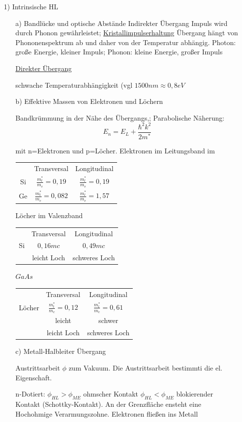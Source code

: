 \begin{enumerate}
\item[1)] Intrinsische HL

  \begin{enumerate}
  \item[a)] Bandlücke und optische Abstände Indirekter Übergang
 Impuls wird durch Phonon gewährleistet; 
    \underline{ Kristallimpulserhaltung}
Übergang hängt von  Phononenspektrum ab und daher von der Temperatur abhängig. Photon: große Energie, kleiner Impuls; Phonon: kleine Energie, großer Impuls

\underline{Direkter Übergang}

schwache Temperaturabhängigkeit (vgl \(1500nm\approx 0,8eV\)
  \item[b)] Effektive Massen von Elektronen und Löchern

 Bandkrümmung in der Nähe des Übergangs,; Parabolische Näherung:
\[E_n= E_L + \frac{\hbar^2 k^2}{2m^*}\]

mit n=Elektronen und p=Löcher. Elektronen im Leitungsband im 

\begin{tabular}{ccc}
&Transversal&Longitudinal\\
  Si & \(\frac{m^*_t}{m_e}=0,19\)& \(\frac{m^*_l}{m_e}=0,19\)\\
Ge&  \(\frac{m^*_t}{m_e}=0,082\)& \(\frac{m^*_l}{m_e}=1,57\)
\end{tabular}

Löcher im Valenzband
\begin{tabular}{ccc}
&Transversal&Longitudinal\\
  Si & \(0,16mc\)& \(0,49mc\)\\
& leicht Loch& schweres Loch
\end{tabular}

\(GaAs\)
\begin{tabular}{ccc}
&Transversal&Longitudinal\\
  Löcher & \(\frac{m^*_t}{m_e}=0,12\)& \(\frac{m^*_l}{m_e}=0,61\)\\
&leicht&schwer\\
& leicht Loch& schweres Loch
\end{tabular}
 
  \item[c)] Metall-Halbleiter Übergang

Austrittsarbeit \(\phi\) zum Vakuum. Die Austrittsarbeit bestimmti die el. Eigenschaft.

n-Dotiert: \(\phi_{HL}>\phi_{ME}\) ohmscher Kontakt
\(\phi_{HL}<\phi_{ME}\) blokierender Kontakt (Schottky-Kontakt). An der Grenzfläche ensteht eine Hochohmige Verarmungszohne. Elektronen fließen ins Metall


\end{enumerate}
\end{enumerate}
